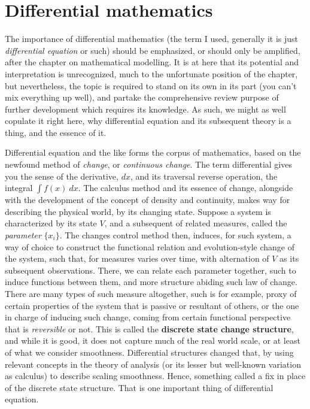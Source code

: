 \chapter{Differential mathematics}
The importance of differential mathematics (the term I used, generally it is just \textit{differential equation} or such) should be emphasized, or should only be amplified, after the chapter on mathematical modelling. It is at here that its potential and interpretation is unrecognized, much to the unfortunate position of the chapter, but nevertheless, the topic is required to stand on its own in its part (you can't mix everything up well), and partake the comprehensive review purpose of further development which requires its knowledge. As such, we might as well copulate it right here, why differential equation and its subsequent theory is a thing, and the essence of it.

Differential equation and the like forms the corpus of mathematics, based on the newfound method of \textit{change}, or \textit{continuous change}. The term differential gives you the sense of the derivative, $dx$, and its traversal reverse operation, the integral $\int f(x)\: dx$. The calculus method and its essence of change, alongside with the development of the concept of density and continuity, makes way for describing the physical world, by its changing state. Suppose a system is characterized by its state $V$, and a subsequent of related measures, called the \textit{parameter} $\{x_{i}\}$. The changes control method then, induces, for such system, a way of choice to construct the functional relation and evolution-style change of the system, such that, for measures varies over time, with alternation of $V$ as its subsequent observations. There, we can relate each parameter together, such to induce functions between them, and more structure abiding such law of change. There are many types of such measure altogether, such is for example, proxy of certain properties of the system that is passive or resultant of others, or the one in charge of inducing such change, coming from certain functional perspective that is \textit{reversible} or not. This is called the \textbf{discrete state change structure}, and while it is good, it does not capture much of the real world scale, or at least of what we consider smoothness. Differential structures changed that, by using relevant concepts in the theory of analysis (or its lesser but well-known variation as calculus) to describe scaling smoothness. Hence, something called a fix in place of the discrete state structure. That is one important thing of differential equation. 

